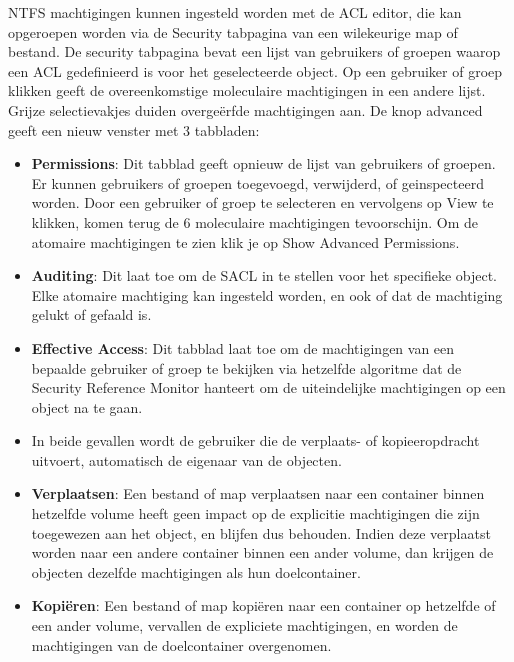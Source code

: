\documentclass{report}
\begin{document}
\begin{enumerate}
{\begin{itemize}
				NTFS machtigingen kunnen ingesteld worden met de ACL editor, die kan opgeroepen worden via de Security tabpagina van een wilekeurige map of bestand. De security tabpagina bevat een lijst van gebruikers of groepen waarop een ACL gedefinieerd is voor het geselecteerde object. Op een gebruiker of groep klikken geeft de overeenkomstige moleculaire machtigingen in een andere lijst. Grijze selectievakjes duiden overgeërfde machtigingen aan. De knop advanced geeft een nieuw venster met 3 tabbladen:
				\begin{itemize}
					\item \textbf{Permissions}: Dit tabblad geeft opnieuw de lijst van gebruikers of groepen. Er kunnen gebruikers of groepen toegevoegd, verwijderd, of geinspecteerd worden. Door een gebruiker of groep te selecteren en vervolgens op View te klikken, komen terug de 6 moleculaire machtigingen tevoorschijn. Om de atomaire machtigingen te zien klik je op Show Advanced Permissions.
					\item \textbf{Auditing}: Dit laat toe om de SACL in te stellen voor het specifieke object. Elke atomaire machtiging kan ingesteld worden, en ook of dat de machtiging gelukt of gefaald is.
					\item \textbf{Effective Access}: Dit tabblad laat toe om de machtigingen van een bepaalde gebruiker of groep te bekijken via hetzelfde algoritme dat de Security Reference Monitor hanteert om de uiteindelijke machtigingen op een object na te gaan.
				\end{itemize}
			\end{itemize}
		}
		
		 { 
			\begin{itemize}
				\item In beide gevallen wordt de gebruiker die de verplaats- of kopieeropdracht uitvoert, automatisch de eigenaar van de objecten. 
				\item \textbf{Verplaatsen}: Een bestand of map verplaatsen naar een container binnen hetzelfde volume heeft geen impact op de explicitie machtigingen die zijn toegewezen aan het object, en blijfen dus behouden. Indien deze verplaatst worden naar een andere container binnen een ander volume, dan krijgen de objecten dezelfde machtigingen als hun doelcontainer.
				\item \textbf{Kopiëren}: Een bestand of map kopiëren naar een container op hetzelfde of een ander volume, vervallen de expliciete machtigingen, en worden de machtigingen van de doelcontainer overgenomen.
			\end{itemize}
		}
		

\end{enumerate}
\end{document}
